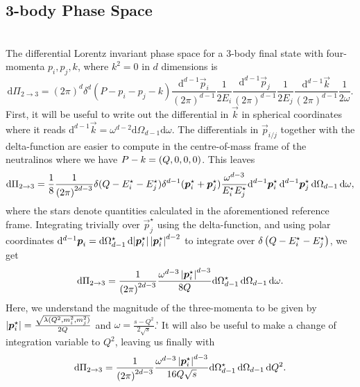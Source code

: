 \documentclass[../main.tex]{subfiles}
\begin{document}
\subsection{3-body Phase Space}
\\
The differential Lorentz invariant phase space for a 3-body final state with
four-momenta \(p_i, p_j, k\), where \(k^2=0\) in \(d\) dimensions is
\begin{equation}
  \mathrm{d}\Pi_{2\to 3} = (2\pi)^d \delta^d(P - p_i - p_j - k)
  \frac{\mathrm{d}^{d-1} \vec{p}_i}{(2\pi)^{d-1}} \frac{1}{2E_i}
  \frac{\mathrm{d}^{d-1} \vec{p}_j}{(2\pi)^{d-1}} \frac{1}{2E_j}
  \frac{\mathrm{d}^{d-1} \vec{k}}{(2\pi)^{d-1}} \frac{1}{2\omega}.
\end{equation}
First, it will be useful to write out the differential in \(\vec{k}\) in
spherical coordinates where it reads \(\mathrm{d}^{d-1}\vec{k} = \omega^{d-2}
\mathrm{d}\Omega_{d-1} \mathrm{d}\omega\).
The differentials in \(\vec{p}_{i/j}\) together with the delta-function are
easier to compute in the centre-of-mass frame of the neutralinos where we have
\(P - k = \left(Q, 0, 0, 0\right)\).
This leaves
\begin{equation}
  \mathrm{d}\Pi_{2\to 3} = \frac{1}{8} \frac{1}{\left(2\pi\right)^{2d-3}}
  \delta(Q - E_i^\star - E_j^\star) \delta^{d-1}(\boldsymbol{p}^\star_i +
  \boldsymbol{p}_j^\star) \frac{\omega^{d-3}}{E_i^\star E_j^\star}
  \mathrm{d}^{d-1}\boldsymbol{p}_i^\star\, \mathrm{d}^{d-1}\boldsymbol{p}_j^\star\,
  \mathrm{d}\Omega_{d-1}\, \mathrm{d}\omega,
\end{equation}
where the stars denote quantities calculated in the aforementioned reference
frame.
Integrating trivially over \(\vec{p}_j^\star\) using the delta-function, and
using polar coordinates \(\mathrm{d}^{d-1}\boldsymbol{p}_i =
\mathrm{d}\Omega_{d-1}^\star \, \mathrm{d}\!\left|\boldsymbol{p}_i^\star\right|
\left|\boldsymbol{p}_i^\star\right|^{d-2}\) to integrate over \(\delta\left(Q - E_i^\star
  - E_j^\star\right)\), we get
\begin{equation}
  \mathrm{d}\Pi_{2\to 3} = \frac{1}{\left(2\pi\right)^{2d-3}}
  \frac{\omega^{d-3} \left|\boldsymbol{p}_i^\star\right|^{d-3}}{8Q}
  \mathrm{d}\Omega_{d-1}^\star\, \mathrm{d}\Omega_{d-1}\,
  \mathrm{d}\omega.
\end{equation}
Here, we understand the magnitude of the three-momenta to be given by
\(\left|\boldsymbol{p}_i^\star\right| = \frac{\sqrt{\lambda(Q^2, m_i^2, m_j^2)}}{2Q}\) and
\(\omega = \frac{s-Q^2}{2\sqrt{s}}\).'
It will also be useful to make a change of integration variable to \(Q^2\),
leaving us finally with
\begin{equation}
  \mathrm{d}\Pi_{2\to 3} = \frac{1}{\left(2\pi\right)^{2d-3}}
  \frac{\omega^{d-3} \left|\boldsymbol{p}_i^\star\right|^{d-3}}{16Q\sqrt{s}}
  \mathrm{d}\Omega_{d-1}^\star\, \mathrm{d}\Omega_{d-1}\, \mathrm{d}Q^2.
\end{equation}
\end{document}
